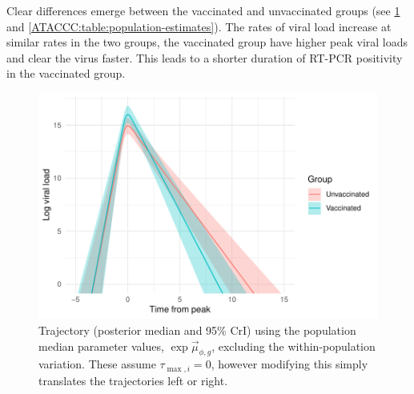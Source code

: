 \documentclass[thesis.tex]{subfiles}
\begin{document}
Clear differences emerge between the vaccinated and unvaccinated groups (see \cref{ATACCC:fig:median-trajectories} and \cref{ATACCC:table:population-estimates}).
The rates of viral load increase at similar rates in the two groups, the vaccinated group have higher peak viral loads and clear the virus faster.
This leads to a shorter duration of RT-PCR positivity in the vaccinated group.
\begin{figure}
  \centering \includegraphics{ATACCC/mean_trajectories}
  \caption[Median viral load trajectories]{Trajectory (posterior median and 95\% CrI) using the population median parameter values, $\exp \vec{\mu}_{\phi,g}$, excluding the within-population variation. These assume $\tau_{\max,i}=0$, however modifying this simply translates the trajectories left or right. \label{ATACCC:fig:median-trajectories}}
\end{figure}
\begin{table}
  \caption{Population-level estimates of the viral load parameters (posterior medians and 95\% CrI). The vaccinated population have higher peak viral loads but clear the virus faster. \label{ATACCC:table:population-estimates}}
\end{table}
\end{document}
